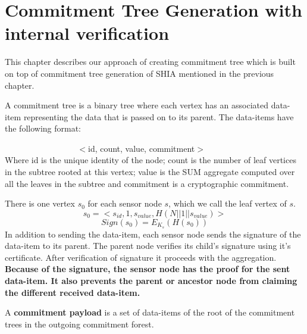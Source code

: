 \chapter{Commitment Tree Generation with internal verification} %
\label{cha:A Protocol for Commitment Tree Generation}
	
	This chapter describes our approach of creating commitment tree which is built on top of commitment tree generation of SHIA mentioned in the previous chapter.

	\begin{definition}
		\label{def:data-item}
		A commitment tree is a binary tree where each vertex has an associated data-item representing the data that is passed on to its parent. The data-items have the following format:

		$\hspace{100pt}$ $<$id, count, value, commitment$>$\\
		Where id is the unique identity of the node; count is the number of leaf vertices in the subtree rooted at this vertex; value is the SUM aggregate computed over all the leaves in the subtree and commitment is a cryptographic commitment.
	\end{definition}
	There is one vertex $s_{0}$ for each sensor node $s$, which we call the leaf vertex of $s$. 
	\begin{equation}
		\label{eq:leaf-vertex}
		s_{0} = <s_{id}, 1, s_{value}, H(N||1||s_{value})>
	\end{equation}
	\begin{equation}
		Sign(s_{0}) = E_{K_{s}}(H(s_{0}))
	\end{equation}
	In addition to sending the data-item, each sensor node sends the signature of the data-item to its parent.
	The parent node verifies its child's signature using it's certificate.
	After verification of signature it proceeds with the aggregation.
	\textbf{Because of the signature, the sensor node has the proof for the sent data-item.
	It also prevents the parent or ancestor node from claiming the different received data-item.}
	\begin{definition}
		A \textbf{commitment payload} is a set of data-items of the root of the commitment trees in the outgoing commitment forest.
	\end{definition}

	\newpage
